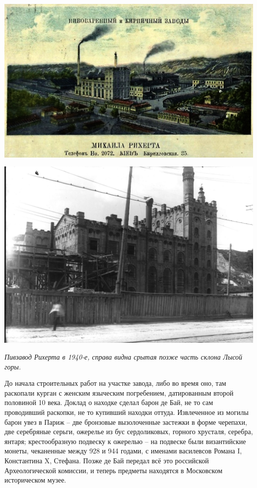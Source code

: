 \begin{center}
\includegraphics[width=\linewidth]{chast-kirvys/lys02/rihert-dorev.jpg}
\end{center}


\begin{center}
\includegraphics[width=\linewidth]{chast-kirvys/lys02/1940-riherta.jpg}

\textit{Пивзавод Рихерта в 1940-е, справа видна срытая позже часть склона Лысой горы.}
\end{center}

До начала строительных работ на участке завода, либо во время оно, там раскопали курган с женским языческим погребением, датированным второй половиной 10 века. Доклад о находке сделал барон де Бай, не то сам проводивший раскопки, не то купивший находки оттуда. Извлеченное из могилы барон увез в Париж – две бронзовые вызолоченные застежки в форме черепахи, две серебряные серьги, ожерелье из бус сердоликовых, горного хрусталя, серебра, янтаря; крестообразную подвеску к ожерелью – на подвеске были византийские монеты, чеканенные между 928 и 944 годами, с именами василевсов Романа I, Константина X, Стефана. Позже де Бай передал всё это российской Археологической комиссии, и теперь предметы находятся в Московском историческом музее.

